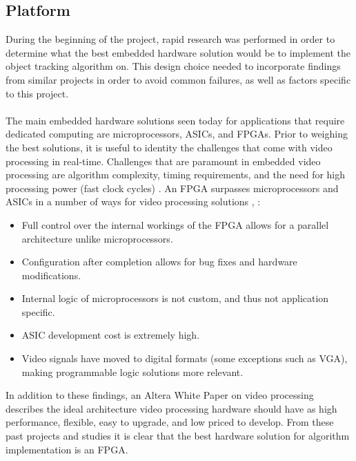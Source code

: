 \documentclass[12pt]{article} %
\begin{document}
\subsection{Platform}
\label{sec:platform}
During the beginning of the project, rapid research was performed in order to determine what the best embedded hardware solution would be to implement the object tracking algorithm on. This design choice needed to incorporate findings from similar projects in order to avoid common failures, as well as factors specific to this project. \\\\
The main embedded hardware solutions seen today for applications that require dedicated computing are microprocessors, ASICs, and FPGAs. Prior to weighing the best solutions, it is useful to identity the challenges that come with video processing in real-time. Challenges that are paramount in embedded video processing are algorithm complexity, timing requirements, and the need for high processing power (fast clock cycles) \cite{2}.  An FPGA surpasses microprocessors and ASICs in a number of ways for video processing  solutions \cite{1}, \cite{2}:
\begin{itemize}
\item Full control over the internal workings of the FPGA allows for a parallel architecture unlike microprocessors.
\item Configuration after completion allows for bug fixes and hardware modifications.
\item Internal logic of microprocessors is not custom, and thus not application specific.
\item ASIC development cost is extremely high.
\item Video signals have moved to digital formats (some exceptions such as VGA), making programmable logic solutions more relevant.
\end{itemize}
In addition to these findings, an Altera White Paper \cite{3} on video processing describes the ideal architecture video processing hardware should have as high performance, flexible, easy to upgrade, and low priced to develop. From these past projects and studies it is clear that the best hardware solution for algorithm implementation is an FPGA. \\\\
\end{document}

